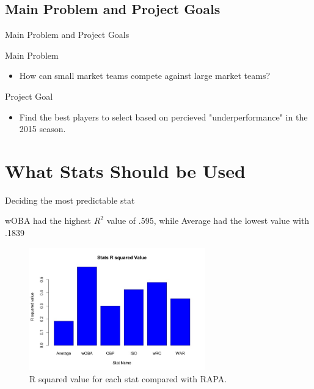 \documentclass{beamer}
\begin{document}
\subsection{Main Problem and Project Goals}

\begin{frame}{Main Problem and Project Goals}

\begin{block}{Main Problem}
\begin{itemize}


\item How can small market teams compete against large market teams?
\end{itemize}
\end{block}
\vspace{.75in}
\pause
\begin{block}{Project Goal}
\begin{itemize}
\item Find the best players to select based on percieved "underperformance" in the 2015 season.
\end{itemize}
\end{block}



\end{frame}

\section{What Stats Should be Used}

\begin{frame}{Deciding the most predictable stat}

\begin{block}{wOBA had the highest $R^2$ value of .595, while Average had the lowest value with .1839}

\begin{figure}
\includegraphics[width=3in]{Rsquared.jpeg}
\caption{\label{fig:your-figure}R squared value for each stat compared with RAPA.}
\end{figure}
\end{block}
\end{frame}
\end{document}
